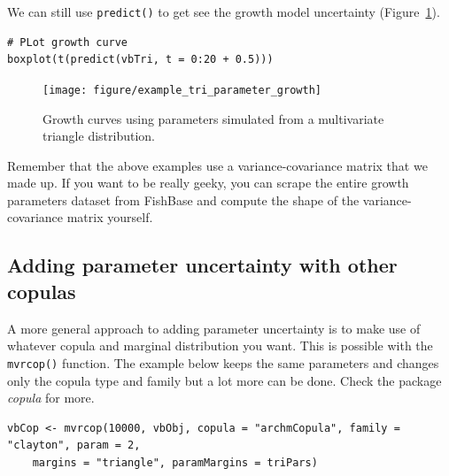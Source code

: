 \documentclass[a4paper,english,10pt]{article}\usepackage[]{graphicx}\usepackage[]{color}
\makeatletter
\newenvironment{kframe}{%
 \def\at@end@of@kframe{}%
 \ifinner\ifhmode%
  \def\at@end@of@kframe{\end{minipage}}%
  \begin{minipage}{\columnwidth}%
 \fi\fi%
 \def\FrameCommand##1{\hskip\@totalleftmargin \hskip-\fboxsep
 \colorbox{shadecolor}{##1}\hskip-\fboxsep
     \hskip-\linewidth \hskip-\@totalleftmargin \hskip\columnwidth}%
 \MakeFramed {\advance\hsize-\width
   \@totalleftmargin\z@ \linewidth\hsize
   \@setminipage}}%
 {\par\unskip\endMakeFramed%
 \at@end@of@kframe}
\newenvironment{knitrout}{}{} %
\newcommand{\code}[1]{{\texttt{#1}}}
\makeatother
\begin{document}
We can still use \code{predict()} to get see the growth model uncertainty (Figure~\ref{fig:plot_tri_growth}).

\begin{knitrout}
\color{fgcolor}\begin{kframe}
\begin{verbatim}
# PLot growth curve
boxplot(t(predict(vbTri, t = 0:20 + 0.5)))
\end{verbatim}
\end{kframe}
\end{knitrout}


\begin{figure}[h]
\begin{knitrout}
\color{fgcolor}

{\centering \texttt{[image: figure/example\_tri\_parameter\_growth]} 

}



\end{knitrout}

\caption{Growth curves using parameters simulated from a multivariate triangle distribution.}
\label{fig:plot_tri_growth}
\end{figure}

Remember that the above examples use a variance-covariance matrix that we made up.
If you want to be really geeky, you can scrape the entire growth parameters dataset from FishBase and compute the shape of the variance-covariance matrix yourself.

\subsection{Adding parameter uncertainty with other copulas}

A more general approach to adding parameter uncertainty is to make use of whatever copula and marginal distribution you want.
This is possible with the \code{mvrcop()} function. The example below keeps the same parameters and changes only the copula type and family but a lot more can be done. Check the package \emph{copula} for more. 


\begin{knitrout}
\color{fgcolor}\begin{kframe}
\begin{verbatim}
vbCop <- mvrcop(10000, vbObj, copula = "archmCopula", family = "clayton", param = 2, 
    margins = "triangle", paramMargins = triPars)
\end{verbatim}
\end{kframe}
\end{knitrout}
\end{document}
